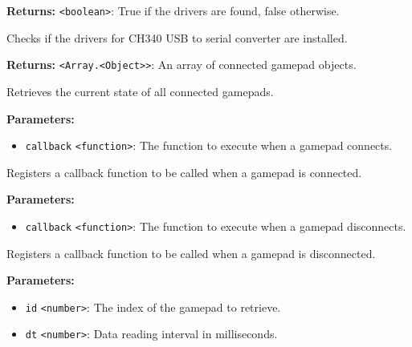 \documentclass[12pt,a4paper]{article}
\begin{document}
\noindent \textbf{Returns:} \texttt{<boolean>}: True if the drivers are found, false otherwise.

\noindent Checks if the drivers for CH340 USB to serial converter are installed.

\vspace{5mm}
\noindent {}


\noindent \textbf{Returns:} \texttt{<Array.<Object>>}: An array of connected gamepad objects.

\noindent Retrieves the current state of all connected gamepads.

\vspace{5mm}
\noindent {}


\noindent \textbf{Parameters:}
\begin{itemize}
  \item \texttt{callback} \texttt{<function>}: The function to execute when a gamepad connects.
\end{itemize}

\noindent Registers a callback function to be called when a gamepad is connected.

\vspace{5mm}
\noindent {}


\noindent \textbf{Parameters:}
\begin{itemize}
  \item \texttt{callback} \texttt{<function>}: The function to execute when a gamepad disconnects.
\end{itemize}

\noindent Registers a callback function to be called when a gamepad is disconnected.

\vspace{5mm}
\noindent {}


\noindent \textbf{Parameters:}
\begin{itemize}
  \item \texttt{id} \texttt{<number>}: The index of the gamepad to retrieve.
  \item \texttt{dt} \texttt{<number>}: Data reading interval in milliseconds.
\end{itemize}
\end{document}
